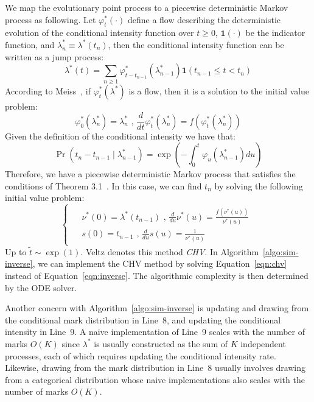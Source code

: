 \documentclass{juliacon}
\begin{document}
We map the evolutionary point process to a piecewise deterministic Markov process as following. Let \( \varphi_t^\ast( \cdot ) \) define a flow describing the deterministic evolution of the conditional intensity function over \( t \geq 0 \), \( \mathbf{1}( \cdot ) \) be the indicator function, and \( \lambda^\ast_n \equiv \lambda^\ast(t_n) \),  then the conditional intensity function can be written as a jump process:
\[
  \lambda^\ast (t) = \sum_{n \geq 1} \varphi^\ast_{t - t_{n-1}} ( \lambda_{n-1}^\ast ) \mathbf{1}(t_{n-1} \leq t < t_n)
\]
According to Meiss~\cite{meiss2017}, if \( \varphi^\ast_t (\lambda^\ast) \) is a flow, then it is a solution to the initial value problem:
\[
  \varphi^\ast_0 (\lambda_n^\ast) = \lambda_n^\ast \text{ , } 
  \frac{d}{dt} \varphi^\ast_t (\lambda_n^\ast) = f(\varphi^\ast_t (\lambda_n^\ast))
\]
Given the definition of the conditional intensity we have that:
\[
\Pr(t_n - t_{n-1} \mid \lambda_{n-1}^\ast) = \exp \left( -\int_0^t \varphi_u (\lambda_{n-1}^\ast) du \right)
\]
Therefore, we have a piecewise deterministic Markov process that satisfies the conditions of Theorem 3.1~\cite{veltz2015}. In this case, we can find \( t_n \) by solving the following initial value problem:
\begin{equation} \label{eqn:chv}
  \begin{cases}
  \begin{aligned}
    & \nu^\ast (0) = \lambda^\ast (t_{n-1}) \text{ , } \frac{d}{d u} \nu^\ast (u) = \frac{f(\nu^\ast (u))}{\nu^\ast (u)} \\
    & s (0) = t_{n-1} \text{ , } \frac{d}{d u} s (u) = \frac{1}{\nu^\ast (u)}
  \end{aligned}
  \end{cases}
\end{equation} 
Up to \( \tilde{t} \sim \exp(1) \). Veltz denotes this method \textit{CHV}. In Algorithm~\ref{algo:sim-inverse}, we can implement the CHV method by solving Equation~\ref{eqn:chv} instead of Equation~\ref{eqn:inverse}. The algorithmic complexity is then determined by the ODE solver.

Another concern with Algorithm~\ref{algo:sim-inverse} is updating and drawing from the conditional mark distribution in Line~8, and updating the conditional intensity in Line~9. A naive implementation of Line~9 scales with the number of marks \( O(K) \) since \( \lambda^\ast \) is usually constructed as the sum of \( K \) independent processes, each of which requires updating the conditional intensity rate. Likewise, drawing from the mark distribution in Line~8 usually involves drawing from a categorical distribution whose naive implementations also scales with the number of marks \( O(K) \).
\end{document}
